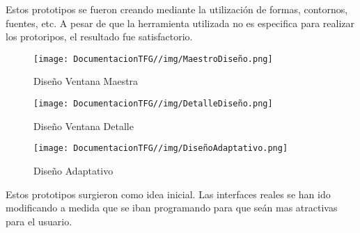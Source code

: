 Estos prototipos se fueron creando mediante la utilización de formas, contornos, fuentes, etc. A pesar de que la herramienta utilizada no es especifica para realizar los protoripos, el resultado fue satisfactorio.

\begin{figure}[H]
    \centering
    \texttt{[image: DocumentacionTFG//img/MaestroDiseño.png]}
    \caption{Diseño Ventana Maestra}
\end{figure}

\begin{figure}[H]
    \centering
    \texttt{[image: DocumentacionTFG//img/DetalleDiseño.png]}
    \caption{Diseño Ventana Detalle}
\end{figure}

\begin{figure}[H]
    \centering
    \texttt{[image: DocumentacionTFG//img/DiseñoAdaptativo.png]}
    \caption{Diseño Adaptativo}
\end{figure}

Estos prototipos surgieron como idea inicial. Las interfaces reales se han ido modificando a medida que se iban programando para que seán mas atractivas para el usuario.
